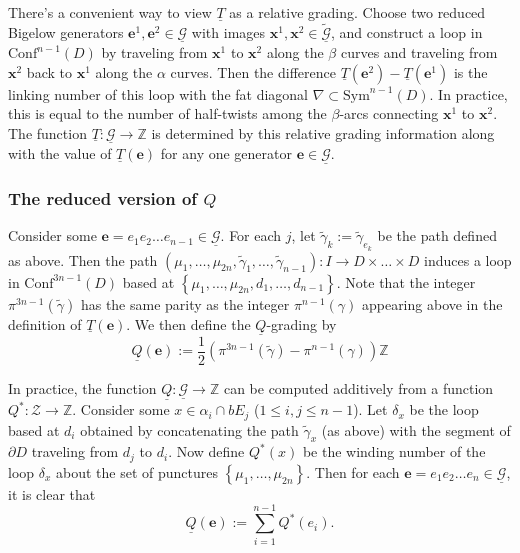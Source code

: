 \documentclass[11pt]{article}
\theoremstyle{plain} \newtheorem{thm}{Theorem}[subsection]
\theoremstyle{plain} \newtheorem{cor}[thm]{Corollary}
\theoremstyle{plain} \newtheorem{prop}[thm]{Proposition}
\theoremstyle{plain} \newtheorem{conj}[thm]{Conjecture}
\theoremstyle{plain} \newtheorem{lem}[thm]{Lemma}
\theoremstyle{definition} \newtheorem{df}[thm]{Definition}
\theoremstyle{remark} \newtheorem{rmk}[thm]{Remark}
\theoremstyle{remark} \newtheorem{obs}[thm]{Observation}
\newcommand{\Zcal}{\mathcal{Z}}
\newcommand{\G}{\mathcal{G}}
\newcommand{\tld}[1]{\widetilde{#1}}
\newcommand{\Gtil}{\tld{\mathcal{G}}}
\newcommand{\red}[1]{\underline{#1}}
\newcommand{\bx}{\mathbf{x}}
\newcommand{\be}{\mathbf{e}}
\numberwithin{equation}{section}
\begin{document}
There's a convenient way to view $\red{T}$ as a relative grading.  Choose two reduced Bigelow generators $\be^1,\be^2 \in \red{\G}$ with images $\bx^1, \bx^2 \in \red{\Gtil}$, and construct a loop in $\text{Conf}^{n-1}(D)$ by traveling from $\bx^1$ to $\bx^2$ along the $\beta$ curves and traveling from $\bx^2$ back to $\bx^1$ along the $\alpha$ curves.  Then the difference $\red{T}(\be^2) - \red{T}(\be^1)$ is the linking number of this loop with the fat diagonal $\nabla \subset \text{Sym}^{n-1}(D)$.  In practice, this is equal to the number of half-twists among the $\beta$-arcs connecting $\bx^1$ to $\bx^2$.  The function $\red{T}:\red{\G} \rightarrow \mathbb{Z}$ is determined by this relative grading information along with the value of $\red{T}(\be)$ for any one generator $\be \in \red{\G}$.

\subsubsection{The reduced version of $Q$}

Consider some $\be =  e_{1} e_{2} \ldots e_{n-1}  \in \red{\G}$.  For each $j$, let $\tld{\gamma}_{k}:=\tld{\gamma}_{e_k}$ be the path defined as above.  Then the path $\left(\mu_1, \ldots, \mu_{2n}, \tld{\gamma}_1, \ldots, \tld{\gamma}_{n-1}\right) : I \rightarrow D \times \ldots \times D$ induces a loop in $\text{Conf}^{3n-1}(D)$ based at $\left\{ \mu_1, \ldots, \mu_{2n}, d_1, \ldots, d_{n-1} \right\}$.  Note that the integer $\pi^{3n-1}\left(\tld{\gamma}\right)$ has the same parity as the integer $\pi^{n-1}(\gamma)$ appearing above in the definition of $\red{T}(\be)$.  We then define the $\red{Q}$-grading by 
$$\red{Q}(\be) := \frac{1}{2} \left(\pi^{3n-1}\left(\tld{\gamma}\right)  - \pi^{n-1}(\gamma) \right) \mathbb{Z}$$

In practice, the function $\red{Q}: \red{\G} \rightarrow \mathbb{Z}$ can be computed additively from a function $Q^{*}:\Zcal \rightarrow \mathbb{Z}$.  Consider some $x \in \alpha_{i} \cap bE_{j}$ ($1 \leq i,j \leq n-1$).  Let $\delta_x$ be the loop based at $d_i$ obtained by concatenating the path $\tld{\gamma}_x$ (as above) with the segment of $\partial D$ traveling from $d_j$ to $d_i$.  Now define $Q^{*}(x)$ be the winding number of the loop $\delta_x$ about the set of punctures $\left\{ \mu_1, \ldots, \mu_{2n} \right\}$.  Then for each $\be =  e_{1} e_{2} \ldots e_{n}  \in \red{\G}$, it is clear that
\begin{equation*}
\red{Q}(\be) := \sum_{i = 1}^{n-1} Q^{*}(e_{i}).
\end{equation*}
\end{document}
